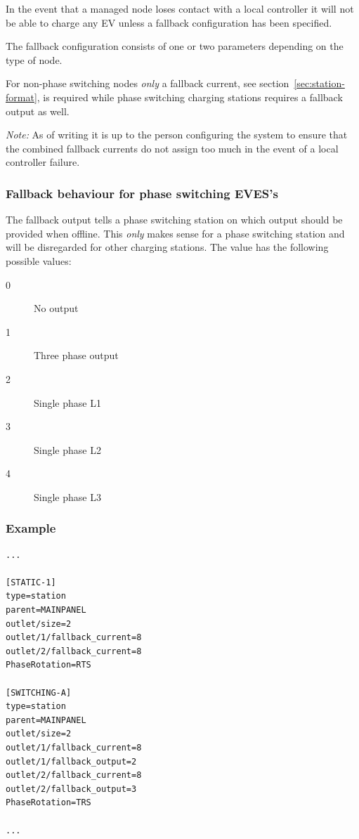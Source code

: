 \documentclass[10pt,a4paper,oneside,headings=big,headsepline]{scrreprt}
\begin{document}
In the event that a managed node loses contact with a local controller it will
not be able to charge any EV unless a fallback configuration has been
specified.

The fallback configuration consists of one or two parameters depending on the
type of node.

For non-phase switching nodes \emph{only} a fallback current, see
section~\ref{sec:station-format}, is required while phase switching charging
stations requires a fallback output as well.

\emph{Note:} As of writing it is up to the person configuring the system to
ensure that the combined fallback currents do not assign too much in the event
of a local controller failure.


\subsubsection{Fallback behaviour for phase switching EVES's}
\label{sec:fallb-behav-phase}

The fallback output tells a phase switching station on which output should be
provided when offline. This \emph{only} makes sense for a phase switching
station and will be disregarded for other charging stations. The value has the
following possible values:

\begin{description}
\item[0] No output
\item[1] Three phase output
\item[2] Single phase L1
\item[3] Single phase L2
\item[4] Single phase L3
\end{description}

\subsubsection{Example}

\begin{verbatim}
...

[STATIC-1]
type=station
parent=MAINPANEL
outlet/size=2
outlet/1/fallback_current=8
outlet/2/fallback_current=8
PhaseRotation=RTS

[SWITCHING-A]
type=station
parent=MAINPANEL
outlet/size=2
outlet/1/fallback_current=8
outlet/1/fallback_output=2
outlet/2/fallback_current=8
outlet/2/fallback_output=3
PhaseRotation=TRS

...
\end{verbatim}
\end{document}

